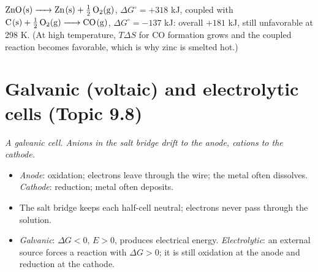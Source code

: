 \documentclass[11pt]{article}
\begin{document}
 $\ce{ZnO(s) -> Zn(s) + 1/2O2(g)}$, $\Delta G^\circ = +318$ kJ, coupled with $\ce{C(s) + 1/2O2(g) -> CO(g)}$, $\Delta G^\circ = -137$ kJ: overall $+181$ kJ, still unfavorable at 298 K. (At high temperature, $T\Delta S$ for CO formation grows and the coupled reaction becomes favorable, which is why zinc is smelted hot.)

\section{Galvanic (voltaic) and electrolytic cells (Topic 9.8)}\label{t:9.8}
\begin{center}

{\small\itshape A galvanic cell. Anions in the salt bridge drift to the anode, cations to the cathode.}
\end{center}
\begin{itemize}
\item \emph{Anode}: oxidation; electrons leave through the wire; the metal often dissolves. \emph{Cathode}: reduction; metal often deposits.
\item The salt bridge keeps each half-cell neutral; electrons never pass through the solution.
\item \emph{Galvanic}: $\Delta G < 0$, $E > 0$, produces electrical energy. \emph{Electrolytic}: an external source forces a reaction with $\Delta G > 0$; it is still oxidation at the anode and reduction at the cathode.
\end{itemize}
\end{document}

